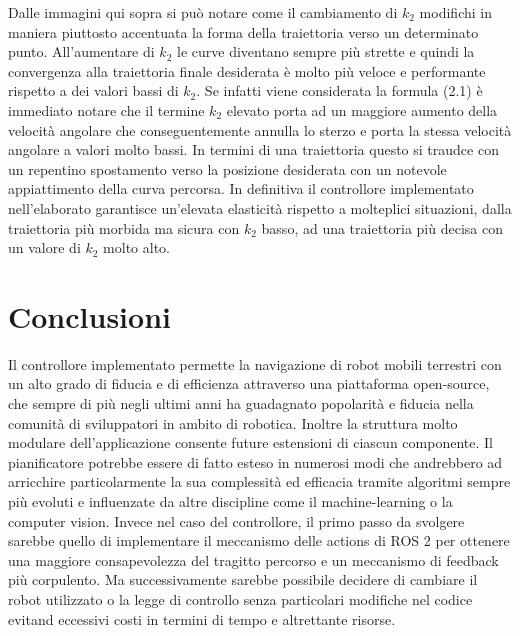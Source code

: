 \documentclass[a4paper,11 pt,oneside]{book}
\theoremstyle{definition}
\begin{document}
Dalle immagini qui sopra si può notare come il cambiamento di $k_2$ modifichi in maniera piuttosto accentuata la forma della traiettoria verso un determinato punto. All'aumentare di $k_2$ le curve diventano sempre più strette e quindi la convergenza alla traiettoria finale desiderata è molto più veloce e performante rispetto a dei valori bassi di $k_2$. Se infatti viene considerata la formula (2.1) è immediato notare che il termine $k_2$ elevato porta ad un maggiore aumento della velocità angolare che conseguentemente annulla lo sterzo e porta la stessa velocità angolare a valori molto bassi. In termini di una traiettoria questo si traudce con un repentino spostamento verso la posizione desiderata con un notevole appiattimento della curva percorsa.
In definitiva il controllore implementato nell'elaborato garantisce un'elevata elasticità rispetto a molteplici situazioni, dalla traiettoria più morbida ma sicura con $k_2$ basso, ad una traiettoria più decisa con un valore di $k_2$ molto alto. 


\chapter{Conclusioni}
Il controllore implementato permette la navigazione di robot mobili terrestri con un alto grado di fiducia e di efficienza attraverso una piattaforma open-source, che sempre di più negli ultimi anni ha guadagnato popolarità e fiducia nella comunità di sviluppatori in ambito di robotica. Inoltre la struttura molto modulare dell'applicazione consente future estensioni di ciascun componente. Il pianificatore potrebbe essere di fatto esteso in numerosi modi che andrebbero ad arricchire particolarmente la sua complessità ed efficacia tramite algoritmi sempre più evoluti e influenzate da altre discipline come il machine-learning o la computer vision. Invece nel caso del controllore, il primo passo da svolgere sarebbe quello di implementare il meccanismo delle actions di ROS 2 per ottenere una maggiore consapevolezza del tragitto percorso e un meccanismo di feedback più corpulento. Ma successivamente sarebbe possibile decidere di cambiare il robot utilizzato o la legge di controllo senza particolari modifiche nel codice evitand eccessivi costi in termini di tempo e  altrettante risorse.

	
	
\end{document}
